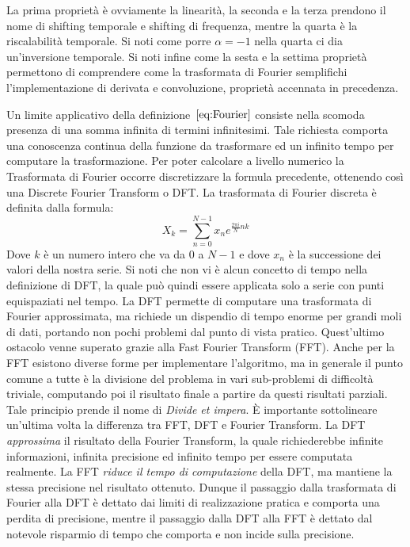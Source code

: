 \documentclass[a4paper, 12pt]{book}
\begin{document}
La prima proprietà è ovviamente la linearità, la seconda e la terza prendono il nome di shifting temporale e shifting di frequenza, mentre la quarta è la riscalabilità temporale.
Si noti come porre $\alpha = -1$ nella quarta ci dia un'inversione temporale.
Si noti infine come la sesta e la settima proprietà permettono di comprendere come la trasformata di Fourier semplifichi l'implementazione di derivata e convoluzione, proprietà accennata in precedenza.
\newline

Un limite applicativo della definizione~$\ref{eq:Fourier}$ consiste nella scomoda presenza di una somma infinita di termini infinitesimi.
Tale richiesta comporta una conoscenza continua della funzione da trasformare ed un infinito tempo per computare la trasformazione.
Per poter calcolare a livello numerico la Trasformata di Fourier occorre discretizzare la formula precedente, ottenendo così una Discrete Fourier Transform o DFT.
La trasformata di Fourier discreta è definita dalla formula:
\begin{equation}
	\label{eq:DFT}
	X_k=\sum_{n=0}^{N-1} x_ne^{\frac{2 \pi i}{N} nk}
\end{equation}
Dove $k$ è un numero intero che va da 0 a $N-1$ e dove $x_n$ è la successione dei valori della nostra serie.
Si noti che non vi è alcun concetto di tempo nella definizione di DFT, la quale può quindi essere applicata solo a serie con punti equispaziati nel tempo.
La DFT permette di computare una trasformata di Fourier approssimata, ma richiede un dispendio di tempo enorme per grandi moli di dati, portando non pochi problemi dal punto di vista pratico.
Quest'ultimo ostacolo venne superato grazie alla Fast Fourier Transform (FFT).
Anche per la FFT esistono diverse forme per implementare l'algoritmo, ma in generale il punto comune a tutte è la divisione del problema in vari sub-problemi di difficoltà triviale, computando poi il risultato finale a partire da questi risultati parziali.
Tale principio prende il nome di \textit{Divide et impera}.
È importante sottolineare un'ultima volta la differenza tra FFT, DFT e Fourier Transform.
La DFT \textit{approssima} il risultato della Fourier Transform, la quale richiederebbe infinite informazioni, infinita precisione ed infinito tempo per essere computata realmente.
La FFT \textit{riduce il tempo di computazione} della DFT, ma mantiene la stessa precisione nel risultato ottenuto.
Dunque il passaggio dalla trasformata di Fourier alla DFT è dettato dai limiti di realizzazione pratica e comporta una perdita di precisione, mentre il passaggio dalla DFT alla FFT è dettato dal notevole risparmio di tempo che comporta e non incide sulla precisione.
\end{document}
